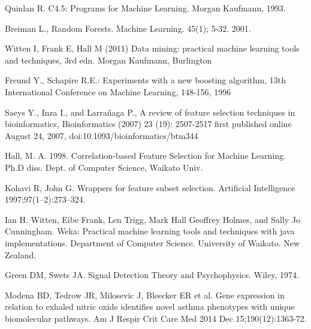 \documentclass[conference,a4paper]{IEEEtran}
\begin{document}
\begin{thebibliography}{1}
	Quinlan R. C4.5: Programs for Machine Learning. Morgan Kaufmann, 1993.
	
	 Breiman L., Random Forests. Machine Learning. 45(1); 5-32. 2001.
	
	 Witten I, Frank E, Hall M (2011) Data mining: practical machine learning tools and techniques, 3rd edn. Morgan Kaufmann, Burlington
	
	 Freund Y., Schapire R.E.: Experiments with a new boosting algorithm, 13th International Conference on Machine Learning, 148-156, 1996
	
	 Saeys Y., Inza I., and Larra\~naga P., A review of feature selection techniques in bioinformatics, Bioinformatics (2007) 23 (19): 2507-2517 first published online August 24, 2007, doi:10.1093/bioinformatics/btm344
	
	 Hall, M. A. 1998. Correlation-based Feature Selection for Machine Learning. Ph.D diss. Dept. of Computer Science, Waikato Univ.
	
	Kohavi R, John G. Wrappers for feature subset selection. Artificial Intelligence 1997;97(1–2):273–324.
	
	 Ian H. Witten, Eibe Frank, Len Trigg, Mark Hall Geoffrey Holmes, and Sally Jo Cunningham. Weka: Practical machine learning tools and techniques with java implementations. Department of Computer Science. University of Waikato. New Zealand.
	
	 Green DM, Swets JA. Signal Detection Theory and Psychophysics. Wiley, 1974.
	
	 Modena BD, Tedrow JR, Milosevic J, Bleecker ER et al. Gene expression in relation to exhaled nitric oxide identifies novel asthma phenotypes with unique biomolecular pathways. Am J Respir Crit Care Med 2014 Dec 15;190(12):1363-72.
	
	
\end{thebibliography}
\end{document}
